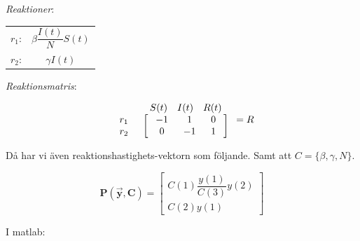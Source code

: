 \textit{Reaktioner}:
\begin{center}
\begin{tabular}{ c c }
 $r_1$: & $\beta\dfrac{I(t)}{N}S(t)$  \\  
 $r_2$: & $\gamma I(t)$  \\    
\end{tabular}
\end{center}

\textit{Reaktionsmatris}:
\begin{center}
\begin{equation*}
\begin{array}{c c} &
\begin{array}{c c c} S(t) & I(t) & R(t) \\
\end{array}
\\
\begin{array}{c c}
r_1 \\
r_2 
\end{array}
&
\left[
\begin{array}{c c c}
\; -1 \; & \;  1 \; & \; 0 \; \\
\;  0 \; & \; -1 \; & \; 1 \; 
\end{array}
\right]
\end{array} = R
\end{equation*}
\end{center}

Då har vi även reaktionshastighets-vektorn som följande. \newline
Samt att $C = \{ \beta, \gamma, N \}$.

\begin{equation*}
    \mathbf{P(\Vec{y}, C)}=
    \begin{bmatrix}
        C(1)\dfrac{y(1)}{C(3)}y(2) \\
        C(2)y(1)
    \end{bmatrix}
\end{equation*}

I matlab: 

